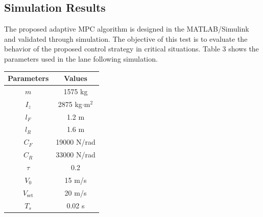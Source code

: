 \documentclass[conference, 11pt]{IEEEtran}
\begin{document}
\subsection{Simulation Results}
The proposed adaptive MPC algorithm is designed in the MATLAB/Simulink and validated through simulation. The objective of this test is to evaluate the behavior of the proposed control strategy in critical situations.
Table 3 shows the parameters used in the lane following simulation.
\begin{table}[!h]
	\centering
	\begin{tabular}{|c|c|}
		\hline
		Parameters          & Values      \\
		\hline
		$m$          & 1575 kg              \\
		$I_z$         & 2875 kg$\cdot$m$^2$              \\
		$l_F$           & 1.2 m               \\
		$l_R$         & 1.6 m               \\
		$C_F$          & 19000 N/rad      \\
		$C_R$           & 33000 N/rad            \\
		$\tau$             & 0.2                \\
		$V_0$           & 15 m/s       \\
		$V_{\text{set}}$          & 20 m/s \\
		$T_s$         & 0.02 s        \\
		\hline
	\end{tabular}
\end{table}
\end{document}
